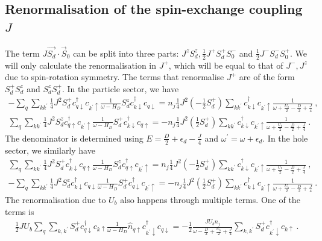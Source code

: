 \subsection{Renormalisation of the spin-exchange coupling \(J\)}
The term \(J \vec{S_d}\cdot\vec{S}_0\) can be split into three parts: \(J^z S_d^z, \frac{1}{2}J^+ S_d^+ S_0^-\) and \(\frac{1}{2}J^- S_d^- S_0^+\). We will only calculate the renormalisation in \(J^+\), which will be equal to that of \(J^-,J^z\) due to spin-rotation symmetry. The terms that renormalise \(J^+\) are of the form \(S_d^+ S_d^z\) and \(S_d^z S_d^+\). In the particle sector, we have
\begin{eqnarray}
	-\sum_{q} \sum_{kk^\prime}\frac{1}{4}J^2 S_d^+ c^\dagger_{q\downarrow}c_{k^\prime \uparrow} \frac{1}{\omega - H_D}S_d^z c^\dagger_{k \downarrow}c_{q \downarrow} = n_j \frac{1}{4}J^2 \left(-\frac{1}{2}S_d^+\right) \sum_{kk^\prime}c^\dagger_{k \downarrow}c_{k^\prime \uparrow} \frac{1}{\omega + \frac{U_b}{2} - \frac{D}{2} + \frac{J}{4}}~,\nonumber\\
	\sum_{q} \sum_{kk^\prime} \frac{1}{4}J^2 S_d^z c^\dagger_{q \uparrow}c_{k^\prime \uparrow} \frac{1}{\omega - H_D} S_d^+ c^\dagger_{k\downarrow}c_{q \uparrow} = -n_j \frac{1}{4}J^2 \left(\frac{1}{2}S_d^+\right) \sum_{kk^\prime}c^\dagger_{k \downarrow}c_{k^\prime \uparrow} \frac{1}{\omega + \frac{U_b}{2} - \frac{D}{2} + \frac{J}{4}}~.\qquad
\end{eqnarray}
The denominator is determined using \(E = \frac{D}{2} + \epsilon_d - \frac{J}{4}\) and \(\omega^\prime = \omega + \epsilon_d\).
In the hole sector, we similarly have
\begin{eqnarray}
	\sum_{q} \sum_{kk^\prime}\frac{1}{4}J^2 S_d^+ c^\dagger_{k\downarrow}c_{q \uparrow} \frac{1}{\omega - H_D}S_d^z c^\dagger_{q \uparrow}c_{k^\prime \uparrow} = n_j \frac{1}{4}J^2 \left(-\frac{1}{2}S_d^+\right) \sum_{kk^\prime}c^\dagger_{k \downarrow}c_{k^\prime \uparrow} \frac{1}{\omega + \frac{U_b}{2} - \frac{D}{2} + \frac{J}{4}}~,\nonumber\\
	-\sum_{q} \sum_{kk^\prime} \frac{1}{4}J^2 S_d^z c^\dagger_{k \downarrow}c_{q \downarrow} \frac{1}{\omega - H_D} S_d^+ c^\dagger_{q\downarrow}c_{k^\prime \uparrow} = -n_j \frac{1}{4}J^2 \left(\frac{1}{2}S_d^+\right) \sum_{kk^\prime}c^\dagger_{k \downarrow}c_{k^\prime \uparrow} \frac{1}{\omega + \frac{U_b}{2} - \frac{D}{2} + \frac{J}{4}}~.
\end{eqnarray}
The renormalisation due to \(U_b\) also happens through multiple terms. One of the terms is
\begin{eqnarray}
	\frac{1}{2} J U_b \sum_{q} \sum_{k,k^\prime} S_d^+ c^\dagger_{q \downarrow} c_{k \uparrow} \frac{1}{\omega - H_D} \hat n_{q \uparrow} c^\dagger_{k^\prime \downarrow}c_{q \downarrow} = -\frac{1}{2}\frac{J U_b n_j}{\omega - \frac{D}{2} + \frac{U_b}{2} + \frac{J}{4}} \sum_{k,k^\prime} S_d^+ c^\dagger_{k^\prime \downarrow} c_{k \uparrow}~.
\end{eqnarray}
